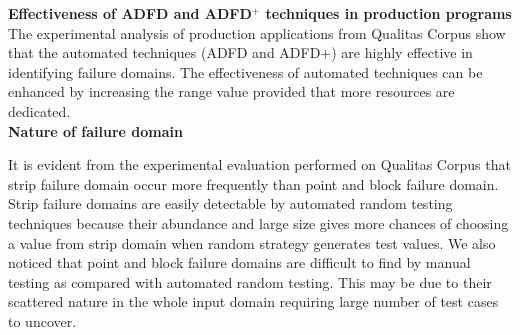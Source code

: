 \textbf{Effectiveness of ADFD and ADFD$^+$ techniques in production programs}
The experimental analysis of production applications from Qualitas Corpus show that the automated techniques (ADFD and ADFD+) are highly effective in identifying failure domains. The effectiveness of automated techniques can be enhanced by increasing the range value provided that more resources are dedicated.\\


\textbf{Nature of failure domain}

It is evident from the experimental evaluation performed on Qualitas Corpus that strip failure domain occur more frequently than point and block failure domain. Strip failure domains are easily detectable by automated random testing techniques because their abundance and large size gives more chances of choosing a value from strip domain when random strategy generates test values. We also noticed that point and block failure domains are difficult to find by manual testing as compared with automated random testing. This may be due to their scattered nature in the whole input domain requiring large number of test cases to uncover. 





